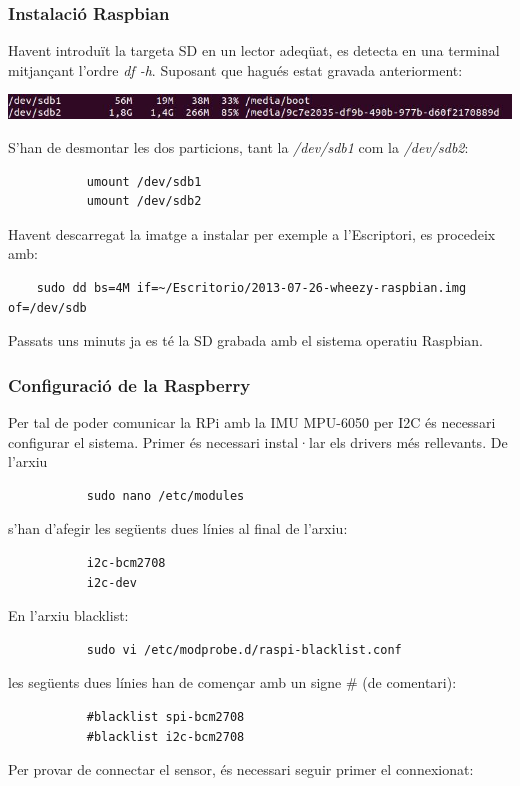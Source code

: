 \documentclass[twoside]{article}
\begin{document}
\subsubsection*{Instalació Raspbian}
Havent introduït la targeta SD en un lector adeqüat, es detecta en una terminal mitjançant l'ordre \textit{df -h}. Suposant que hagués estat gravada anteriorment:
\begin{center}
\includegraphics[scale=0.7]{images/InstalRasp1.jpeg}
\end{center}
S'han de desmontar les dos particions, tant la \textit{/dev/sdb1} com la \textit{/dev/sdb2}:
\begin{verbatim}
           umount /dev/sdb1
           umount /dev/sdb2
\end{verbatim}
Havent descarregat la imatge a instalar per exemple a l'Escriptori, es procedeix amb:
\begin{verbatim}
    sudo dd bs=4M if=~/Escritorio/2013-07-26-wheezy-raspbian.img of=/dev/sdb
\end{verbatim}
Passats uns minuts ja es té la SD grabada amb el sistema operatiu Raspbian.
\subsubsection*{Configuració de la Raspberry}
Per tal de poder comunicar la RPi amb la IMU MPU-6050 per I2C és necessari configurar el sistema. Primer és necessari instal·lar els drivers més rellevants. De l'arxiu
\begin{verbatim}
           sudo nano /etc/modules
\end{verbatim}
s'han d'afegir les següents dues línies al final de l'arxiu:
\begin{verbatim}
           i2c-bcm2708
           i2c-dev
\end{verbatim}
En l'arxiu blacklist:
\begin{verbatim}
           sudo vi /etc/modprobe.d/raspi-blacklist.conf
\end{verbatim}
les següents dues línies han de començar amb un signe \# (de comentari):
\begin{verbatim}
           #blacklist spi-bcm2708
           #blacklist i2c-bcm2708
\end{verbatim}
Per provar de connectar el sensor, és necessari seguir primer el connexionat:
\end{document}
